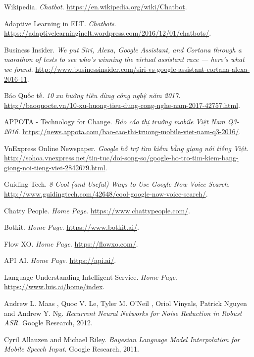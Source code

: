 \documentclass[12pt]{report}
\begin{document}
\begin{thebibliography}{9}

Wikipedia.
\textit{Chatbot}.
\url{https://en.wikipedia.org/wiki/Chatbot}.

Adaptive Learning in ELT. 
\textit{Chatbots}.
\url{https://adaptivelearninginelt.wordpress.com/2016/12/01/chatbots/}.

Business Insider. 
\textit{We put Siri, Alexa, Google Assistant, and Cortana through a marathon of tests to see who's winning the virtual assistant race — here's what we found}.
\url{http://www.businessinsider.com/siri-vs-google-assistant-cortana-alexa-2016-11}.

Báo Quốc tế. 
\textit{10 xu hướng tiêu dùng công nghệ năm 2017}.
\url{http://baoquocte.vn/10-xu-huong-tieu-dung-cong-nghe-nam-2017-42757.html}.

APPOTA - Technology for Change. 
\textit{Báo cáo thị trường mobile Việt Nam Q3-2016}.
\url{https://news.appota.com/bao-cao-thi-truong-mobile-viet-nam-q3-2016/}.

VnExpress Online Newspaper. 
\textit{Google hỗ trợ tìm kiếm bằng giọng nói tiếng Việt}. 
\url{http://sohoa.vnexpress.net/tin-tuc/doi-song-so/google-ho-tro-tim-kiem-bang-giong-noi-tieng-viet-2842679.html}.

Guiding Tech. 
\textit{8 Cool (and Useful) Ways to Use Google Now Voice Search}.
\url{http://www.guidingtech.com/42648/cool-google-now-voice-search/}.

Chatty People. 
\textit{Home Page}.
\url{https://www.chattypeople.com/}.

Botkit. 
\textit{Home Page}.
\url{https://www.botkit.ai/}.

Flow XO. 
\textit{Home Page}.
\url{https://flowxo.com/}.

API AI. 
\textit{Home Page}.
\url{https://api.ai/}.

Language Understanding Intelligent Service. 
\textit{Home Page}.
\url{https://www.luis.ai/home/index}.

Andrew L. Maas , Quoc V. Le, Tyler M. O’Neil , Oriol Vinyals, Patrick Nguyen and Andrew Y. Ng. 
\textit{Recurrent Neural Networks for Noise Reduction in Robust ASR}. 
Google Research, 2012.

Cyril Allauzen and Michael Riley. 
\textit{Bayesian Language Model Interpolation for Mobile Speech Input}. 
Google Research, 2011.


\end{thebibliography}
\end{document}
